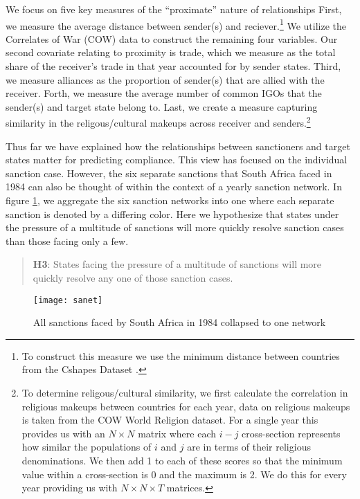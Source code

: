 We focus on five key measures of the ``proximate'' nature of relationships First, we measure the average distance between sender(s) and reciever.\footnote{To construct this measure we use the minimum distance between countries from the Cshapes Dataset \citep{weidmann2010geography}.} We utilize the Correlates of War (COW) data to construct the remaining four variables. Our second covariate relating to proximity is trade, which we measure as the total share of the receiver's trade in that year accounted for by sender states. Third, we measure alliances as the proportion of sender(s) that are allied with the receiver. Forth, we measure the average number of common IGOs that the sender(s) and target state belong to. Last, we create a measure capturing similarity in the religous/cultural makeups across receiver and senders.\footnote{To determine religous/cultural similarity, we first calculate the correlation in religious makeups between countries for each year, data on religious makeups is taken from the COW World Religion dataset. For a single year this provides us with an $N \times N$ matrix where each $i-j$ cross-section represents how similar the populations of $i$ and $j$ are in terms of their religious denominations. We then add 1 to each of these scores so that the minimum value within a cross-section is 0 and the maximum is 2. We do this for every year providing us with $N \times N \times T$ matrices.}

Thus far we have explained how the relationships between sanctioners and target states matter for predicting compliance. This view has focused on the individual sanction case. However, the six separate sanctions that South Africa faced in 1984 can also be thought of within the context of a yearly sanction network. In figure \ref{fig:sanet}, we aggregate the six sanction networks into one where each separate sanction is denoted by a differing color. Here we hypothesize that states under the pressure of a multitude of sanctions will more quickly resolve sanction cases than those facing only a few.

\begin{quote}
	\textbf{H3}: States facing the pressure of a multitude of sanctions will more quickly resolve any one of those sanction cases.
\end{quote}

\begin{figure}[ht]
	\centering
	\texttt{[image: sanet]}
	\caption{All sanctions faced by South Africa in 1984 collapsed to one network}
	\label{fig:sanet}
\end{figure}
\FloatBarrier


